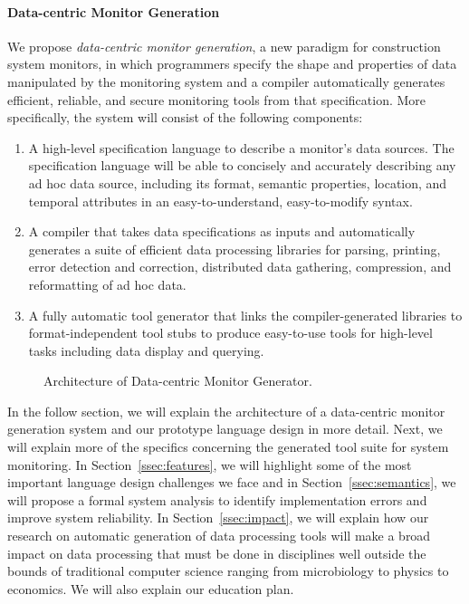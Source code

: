 \paragraph*{Data-centric Monitor Generation}
We propose {\em data-centric monitor generation}, a new paradigm
for construction system monitors, in which programmers
specify the shape and properties of data manipulated by
the monitoring system and a compiler automatically
generates efficient, reliable, and secure
monitoring tools from that specification.
More specifically, the system will consist of the 
following components:

\begin{enumerate}

\item A high-level specification language to describe a monitor's
data sources.  The specification language will be able to
concisely and accurately describing any ad hoc data source,
including its format, semantic properties, location, and
temporal attributes in an easy-to-understand, easy-to-modify syntax.

\item A compiler that takes data specifications as inputs and
automatically generates a suite of 
efficient data processing libraries for parsing, printing, error detection
and correction, distributed data gathering, compression, and 
reformatting of ad hoc data.

\item A fully automatic tool generator that links the compiler-generated 
libraries to format-independent tool stubs to produce easy-to-use 
tools for high-level tasks including data display and querying.

\end{enumerate}

\begin{figure}[t]
\begin{center}
\centerline{}
\end{center}
\caption{\label{fig:arch} Architecture of Data-centric Monitor Generator.
}
\end{figure}

In the follow section, we will explain 
the architecture of a data-centric monitor generation system
and our prototype language design in more detail.  
Next, we will explain more of the specifics concerning
the generated tool suite for system monitoring.
In Section~\ref{ssec:features}, we will highlight some of the most
important language design challenges we face and
in Section~\ref{ssec:semantics}, we will propose a
formal system analysis to identify implementation errors
and improve system reliability.
In Section~\ref{ssec:impact}, we will explain how our research
on automatic generation of data processing tools
will make a broad impact on data processing that must be done
in disciplines well outside the bounds of
traditional computer science ranging from microbiology to physics to
economics.  We will also explain our education plan.

